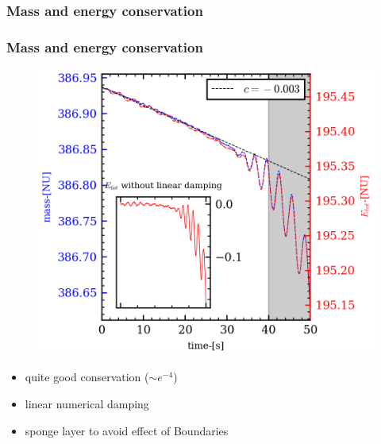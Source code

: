 \documentclass[numbering=fraction]{beamer}
\begin{document}
\subsubsection{Mass and energy conservation}
\begin{frame}
    \frametitle{Mass and energy conservation}
    \begin{minipage}{.7\linewidth}
        \begin{figure}[H]
            \centering
            \includegraphics[width=\linewidth]{./figure/energy.png}
        \end{figure}
    \end{minipage}
    \begin{minipage}{.28\linewidth}
        \begin{itemize}
            \item quite good conservation ($\sim e^{-4}$)
            \item linear numerical damping
            \item sponge layer to avoid effect of Boundaries
        \end{itemize}
    \end{minipage}
\end{frame}
\end{document}
